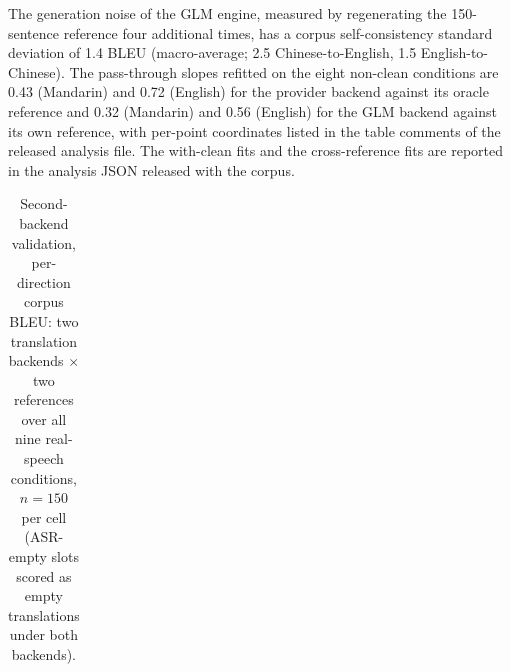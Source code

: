 \documentclass[11pt]{article}
\begin{document}
The generation noise of the GLM engine, measured by regenerating the
150-sentence reference four additional times, has a corpus self-consistency
standard deviation of 1.4 BLEU (macro-average; 2.5 Chinese-to-English,
1.5 English-to-Chinese). The pass-through slopes refitted on the eight
non-clean conditions are
0.43 (Mandarin) and 0.72 (English) for the provider backend against its oracle reference
and 0.32 (Mandarin) and 0.56 (English) for the GLM backend against its own reference, with
per-point coordinates listed in the table comments of the released
analysis file. The with-clean fits and the cross-reference fits are
reported in the analysis JSON released with the corpus.

\begin{table}[t]
\centering
\caption{Second-backend validation, per-direction corpus BLEU:
two translation backends $\times$ two references over all nine
real-speech conditions, $n = 150$ per cell (ASR-empty slots scored as
empty translations under both backends).}
\label{tab:glm9}
\small
\setlength{\tabcolsep}{4pt}
\begin{tabular}{llcc}
\toprule
 \\
\bottomrule
\end{tabular}
\end{table}
\end{document}
